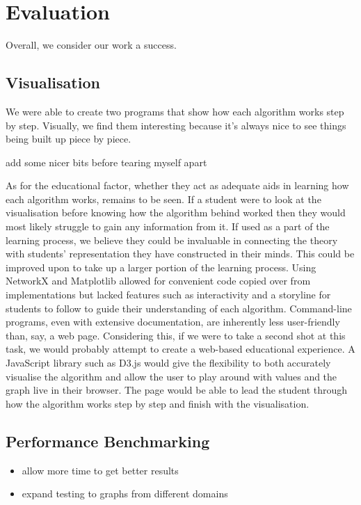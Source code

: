 \section{Evaluation}

Overall, we consider our work a success.

\subsection{Visualisation}

We were able to create two programs that show how each algorithm works
step by step. Visually, we find them interesting because it's always
nice to see things being built up piece by piece.

add some nicer bits before tearing myself apart

As for the educational factor, whether they act as adequate aids in
learning how each algorithm works, remains to be seen. If a student were
to look at the visualisation before knowing how the algorithm behind
worked then they would most likely struggle to gain any information from
it. If used as a part of the learning process, we believe they could be
invaluable in connecting the theory with students' representation they
have constructed in their minds. This could be improved upon to take up
a larger portion of the learning process. Using NetworkX and Matplotlib
allowed for convenient code copied over from implementations but lacked
features such as interactivity and a storyline for students to follow to
guide their understanding of each algorithm. Command-line programs, even
with extensive documentation, are inherently less user-friendly than,
say, a web page. Considering this, if we were to take a second shot at
this task, we would probably attempt to create a web-based educational
experience. A JavaScript library such as D3.js \cite{bostock2011d3}
would give the flexibility to both accurately visualise the algorithm
and allow the user to play around with values and the graph live in
their browser. The page would be able to lead the student through how
the algorithm works step by step and finish with the visualisation.

\subsection{Performance Benchmarking}

\begin{itemize}
    \item
          allow more time to get better results
    \item
          expand testing to graphs from different domains
\end{itemize}


